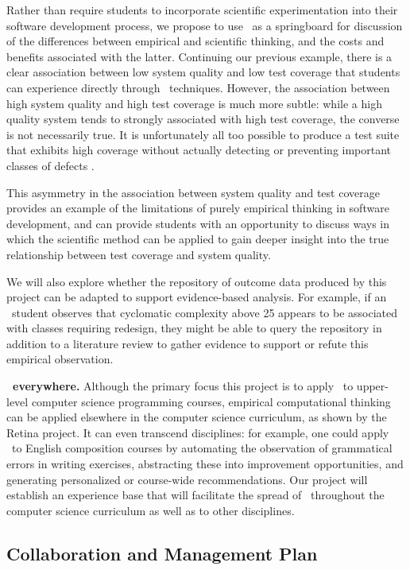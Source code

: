 Rather than require students to incorporate scientific experimentation into
their software development process, we propose to use \eCT\ as a
springboard for discussion of the differences between empirical and
scientific thinking, and the costs and benefits associated with the latter.
Continuing our previous example, there is a clear association between low
system quality and low test coverage that students can experience directly
through \eCT\ techniques.  However, the association between high system
quality and high test coverage is much more subtle: while a high quality
system tends to strongly associated with high test coverage, the converse
is not necessarily true. It is unfortunately all too possible to produce a
test suite that exhibits high coverage without actually detecting or
preventing important classes of defects \citep{Marick99}.

This asymmetry in the association between system quality and test coverage
provides an example of the limitations of purely empirical thinking in
software development, and can provide students with an opportunity to discuss 
ways in which the scientific method can be applied to gain deeper insight into 
the true relationship between test coverage and system quality.  

We will also explore whether the repository of outcome data produced by
this project can be adapted to support evidence-based analysis. For
example, if an \eCT\ student observes that cyclomatic complexity above 25
appears to be associated with classes requiring redesign, they might be
able to query the repository in addition to a literature review to gather
evidence to support or refute this empirical observation.

{\bf \eCT\ everywhere.}  Although the primary focus this project is to
apply \eCT\ to upper-level computer science programming courses, empirical
computational thinking can be applied elsewhere in the computer science
curriculum, as shown by the Retina project.  It can even transcend
disciplines: for example, one could apply \eCT\ to English composition
courses by automating the observation of grammatical errors in writing
exercises, abstracting these into improvement opportunities, and generating
personalized or course-wide recommendations.  Our project will establish an
experience base that will facilitate the spread of \eCT\ throughout the
computer science curriculum as well as to other disciplines.



\subsection{Collaboration and Management Plan}

